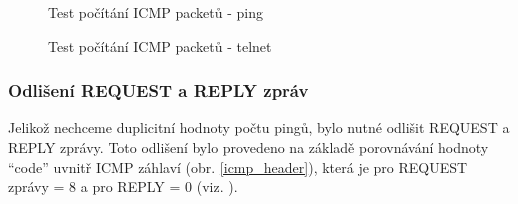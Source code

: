 \documentclass[czech, 11pt]{article}
\begin{document}
    \begin{figure}[H]
        \centering
        
        \caption{Test počítání ICMP packetů - ping}
        \label{ping_test}
    \end{figure}

    \begin{figure}[H]
        \centering
        
        \caption{Test počítání ICMP packetů - telnet}
        \label{telnet_test}
    \end{figure}

    \newpage
    \subsubsection{Odlišení REQUEST a REPLY zpráv}
    Jelikož nechceme duplicitní hodnoty počtu pingů, bylo nutné odlišit REQUEST a REPLY zprávy. Toto odlišení bylo provedeno na základě porovnávání hodnoty \enquote{code} uvnitř ICMP záhlaví (obr. \ref{icmp_header}), která je pro REQUEST zprávy = 8 a pro REPLY = 0 (viz. \cite{icmpmessages}).
\end{document}

